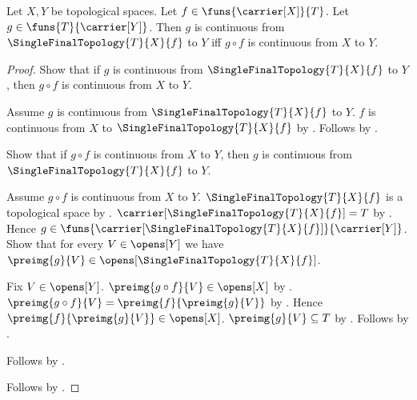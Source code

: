 \begin{theorem}\label{single_final_topology_universal_property}
    Let $X,Y$ be topological spaces.
    Let $f\in\funs{\carrier[X]}{T}$.
    Let $g\in\funs{T}{\carrier[Y]}$.
    Then $g$ is continuous from $\SingleFinalTopology{T}{X}{f}$ to $Y$
        iff $g\circ f$ is continuous from $X$ to $Y$.
\end{theorem}
\begin{proof}
    Show that if $g$ is continuous from
        $\SingleFinalTopology{T}{X}{f}$ to $Y$, then
        $g\circ f$ is continuous from $X$ to $Y$.
    \begin{subproof}
        Assume $g$ is continuous from $\SingleFinalTopology{T}{X}{f}$
            to $Y$.
        $f$ is continuous from $X$ to
            $\SingleFinalTopology{T}{X}{f}$ by
            .
        Follows by .
    \end{subproof}

    Show that if $g\circ f$ is continuous from $X$ to $Y$, then
        $g$ is continuous from $\SingleFinalTopology{T}{X}{f}$ to $Y$.
    \begin{subproof}
        Assume $g\circ f$ is continuous from $X$ to $Y$.
        $\SingleFinalTopology{T}{X}{f}$ is a topological space by
            .
        $\carrier[\SingleFinalTopology{T}{X}{f}]=T$ by
            .
        Hence $g\in\funs{
            \carrier[\SingleFinalTopology{T}{X}{f}]}{\carrier[Y]}$.
        Show that for every $V\in\opens[Y]$ we have
            $\preimg{g}{V}\in
                \opens[\SingleFinalTopology{T}{X}{f}]$.
        \begin{subproof}
            Fix $V\in\opens[Y]$.
            $\preimg{g\circ f}{V}\in\opens[X]$ by
                .
            $\preimg{g\circ f}{V}
                =\preimg{f}{\preimg{g}{V}}$ by
                .
            Hence $\preimg{f}{\preimg{g}{V}}\in\opens[X]$.
            $\preimg{g}{V}\subseteq T$ by
                .
            Follows by .
        \end{subproof}
        Follows by .
    \end{subproof}
    Follows by \auto.
\end{proof}
